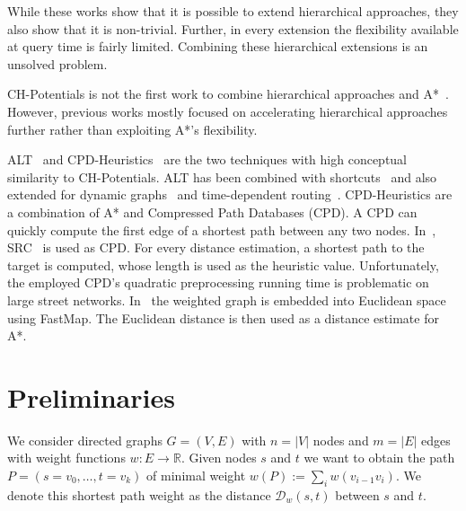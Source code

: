 \documentclass[a4paper,UKenglish,cleveref, autoref, thm-restate]{lipics-v2021}
\newcommand*{\dist}{\mathcal{D}}
\begin{document}
While these works show that it is possible to extend hierarchical approaches, they also show that it is non-trivial.
Further, in every extension the flexibility available at query time is fairly limited.
Combining these hierarchical extensions is an unsolved problem.

CH-Potentials is not the first work to combine hierarchical approaches and A*~\cite{bdsssw-chgds-10,gkw-blwr-07,bdgwz-sfpcs-19}.
However, previous works mostly focused on accelerating hierarchical approaches further rather than exploiting A*'s flexibility.

ALT~\cite{gh-cspas-05,gw-cppsp-05} and CPD-Heuristics~\cite{DBLP:conf/ijcai/BonoGHS19} are the two techniques with high conceptual similarity to CH-Potentials.
ALT has been combined with shortcuts~\cite{bdsssw-chgds-10} and also extended for dynamic graphs~\cite{dw-lbrdg-07} and time-dependent routing~\cite{ndls-bastd-12,dn-crdtd-12}.
%
CPD-Heuristics are a combination of A* and Compressed Path Databases (CPD).
A CPD can quickly compute the first edge of a shortest path between any two nodes.
In~\cite{DBLP:conf/ijcai/BonoGHS19}, SRC~\cite{DBLP:conf/socs/StrasserHB14} is used as CPD.
For every distance estimation, a shortest path to the target is computed, whose length is used as the heuristic value.
Unfortunately, the employed CPD's quadratic preprocessing running time is problematic on large street networks.
%
%
In~\cite{DBLP:conf/ijcai/0002UJAKK18} the weighted graph is embedded into Euclidean space using FastMap. %
The Euclidean distance is then used as a distance estimate for A*.


\section{Preliminaries}\label{sec:preliminaries}

We consider directed graphs $G=(V,E)$ with $n=|V|$ nodes and $m=|E|$ edges with weight functions $w : E \to \mathbb{R}$.
Given nodes $s$ and $t$ we want to obtain the path $P=(s=v_0,\dots,t=v_k)$ of minimal weight $w(P) := \sum_{i} w(v_{i-1}v_i)$.
We denote this shortest path weight as the distance $\dist_w(s,t)$ between $s$ and $t$.
\end{document}
